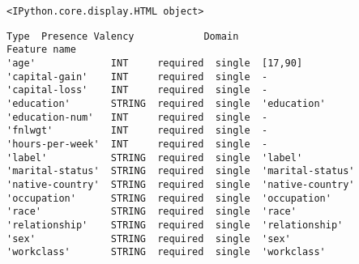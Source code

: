 \documentclass[11pt]{article}
\begin{document}
    
    \begin{Verbatim}[commandchars=\\\{\}]
<IPython.core.display.HTML object>
    \end{Verbatim}

    
    
    \begin{Verbatim}[commandchars=\\\{\}]
                    Type  Presence Valency            Domain
Feature name                                                
'age'             INT     required  single  [17,90]         
'capital-gain'    INT     required  single  -               
'capital-loss'    INT     required  single  -               
'education'       STRING  required  single  'education'     
'education-num'   INT     required  single  -               
'fnlwgt'          INT     required  single  -               
'hours-per-week'  INT     required  single  -               
'label'           STRING  required  single  'label'         
'marital-status'  STRING  required  single  'marital-status'
'native-country'  STRING  required  single  'native-country'
'occupation'      STRING  required  single  'occupation'    
'race'            STRING  required  single  'race'          
'relationship'    STRING  required  single  'relationship'  
'sex'             STRING  required  single  'sex'           
'workclass'       STRING  required  single  'workclass'     
    \end{Verbatim}

    
    
\end{document}
